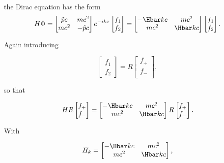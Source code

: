 {the Dirac equation has the form
\begin{dmath}\label{eqn:qmLecture9Problems:460}
H \Phi = 
\begin{bmatrix}
\hat{p} c & m c^2 \\
m c^2 & - \hat{p} c
\end{bmatrix}
e^{-i k x} 
\begin{bmatrix}
f_1 \\
f_2
\end{bmatrix}
=
\begin{bmatrix}
-\Hbar k c & m c^2 \\
m c^2 & \Hbar k c
\end{bmatrix}
\begin{bmatrix}
f_1 \\
f_2
\end{bmatrix}.
\end{dmath}

Again introducing

\begin{dmath}\label{eqn:qmLecture9Problems:480}
\begin{bmatrix}
f_1 \\
f_2
\end{bmatrix}
=
R
\begin{bmatrix}
f_{+} \\
f_{-} \\
\end{bmatrix},
\end{dmath}

so that

\begin{dmath}\label{eqn:qmLecture9Problems:500}
H R 
\begin{bmatrix}
f_{+} \\
f_{-} \\
\end{bmatrix}
=
\begin{bmatrix}
-\Hbar k c & m c^2 \\
m c^2 & \Hbar k c
\end{bmatrix}
R
\begin{bmatrix}
f_{+} \\
f_{-} \\
\end{bmatrix}.
\end{dmath}

With 

\begin{dmath}\label{eqn:qmLecture9Problems:520}
H_k
=
\begin{bmatrix}
-\Hbar k c & m c^2 \\
m c^2 & \Hbar k c
\end{bmatrix},
\end{dmath}

}
